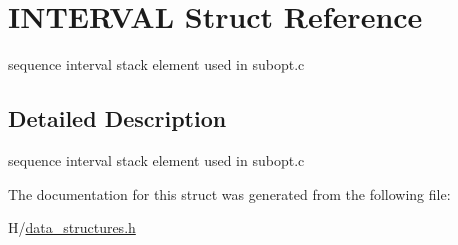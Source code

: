 \hypertarget{structINTERVAL}{
\section{INTERVAL Struct Reference}
\label{structINTERVAL}
}


sequence interval stack element used in subopt.c  




\subsection{Detailed Description}
sequence interval stack element used in subopt.c 

The documentation for this struct was generated from the following file:\begin{DoxyCompactItemize}
\item 
H/\hyperlink{data__structures_8h}{data\_\-structures.h}\end{DoxyCompactItemize}
